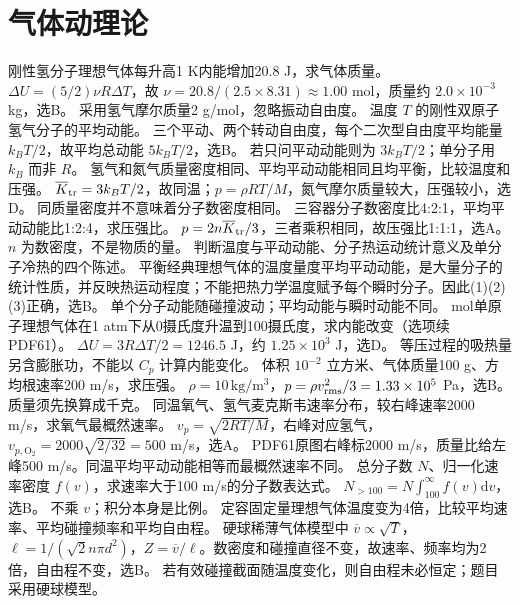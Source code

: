 \section{气体动理论}
\problemtext 刚性氢分子理想气体每升高1 K内能增加20.8 J，求气体质量。
\workings $\Delta U=(5/2)\nu R\Delta T$，故 $\nu=20.8/(2.5\times8.31)\approx1.00$ mol，质量约 $2.0\times10^{-3}$ kg，选B。
\crosscheck 采用氢气摩尔质量2 g/mol，忽略振动自由度。
\problemtext 温度 $T$ 的刚性双原子氢气分子的平均动能。
\workings 三个平动、两个转动自由度，每个二次型自由度平均能量 $k_BT/2$，故平均总动能 $5k_BT/2$，选B。
\crosscheck 若只问平动动能则为 $3k_BT/2$；单分子用 $k_B$ 而非 $R$。
\problemtext 氢气和氮气质量密度相同、平均平动动能相同且均平衡，比较温度和压强。
\workings $\overline K_{\rm tr}=3k_BT/2$，故同温；$p=\rho RT/M$，氮气摩尔质量较大，压强较小，选D。
\crosscheck 同质量密度并不意味着分子数密度相同。
\problemtext 三容器分子数密度比4:2:1，平均平动动能比1:2:4，求压强比。
\workings $p=2n\overline K_{\rm tr}/3$，三者乘积相同，故压强比1:1:1，选A。
\crosscheck $n$ 为数密度，不是物质的量。
\problemtext 判断温度与平动动能、分子热运动统计意义及单分子冷热的四个陈述。
\workings 平衡经典理想气体的温度量度平均平动动能，是大量分子的统计性质，并反映热运动程度；不能把热力学温度赋予每个瞬时分子。因此(1)(2)(3)正确，选B。
\crosscheck 单个分子动能随碰撞波动；平均动能与瞬时动能不同。
 mol单原子理想气体在1 atm下从0摄氏度升温到100摄氏度，求内能改变（选项续PDF61）。
\workings $\Delta U=3R\Delta T/2=1246.5$ J，约 $1.25\times10^3$ J，选D。
\crosscheck 等压过程的吸热量另含膨胀功，不能以 $C_p$ 计算内能变化。
\problemtext 体积 $10^{-2}$ 立方米、气体质量100 g、方均根速率200 m/s，求压强。
\workings $\rho=10\,\mathrm{kg/m^3}$，$p=\rho v_{\rm rms}^2/3=1.33\times10^5$ Pa，选B。
\crosscheck 质量须先换算成千克。
\problemtext 同温氧气、氢气麦克斯韦速率分布，较右峰速率2000 m/s，求氧气最概然速率。
\workings $v_p=\sqrt{2RT/M}$，右峰对应氢气，$v_{p,\mathrm O_2}=2000\sqrt{2/32}=500$ m/s，选A。
\crosscheck PDF61原图右峰标2000 m/s，质量比给左峰500 m/s。同温平均平动动能相等而最概然速率不同。
\problemtext 总分子数 $N$、归一化速率密度 $f(v)$，求速率大于100 m/s的分子数表达式。
\workings $N_{>100}=N\int_{100}^{\infty}f(v)\mathrm dv$，选B。
\crosscheck 不乘 $v$；积分本身是比例。
\problemtext 定容固定量理想气体温度变为4倍，比较平均速率、平均碰撞频率和平均自由程。
\workings 硬球稀薄气体模型中 $\overline v\propto\sqrt T$，$\ell=1/(\sqrt2 n\pi d^2)$，$Z=\overline v/\ell$。数密度和碰撞直径不变，故速率、频率均为2倍，自由程不变，选B。
\crosscheck 若有效碰撞截面随温度变化，则自由程未必恒定；题目采用硬球模型。

